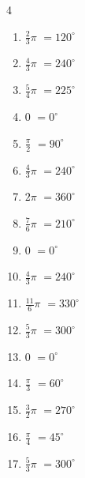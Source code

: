 \begin{multicols}{4}
\begin{enumerate}
  \item $\displaystyle \frac{2}{3}\pi$
        $\displaystyle =120^{\circ}$

  \item $\displaystyle \frac{4}{3}\pi$
        $\displaystyle =240^{\circ}$

  \item $\displaystyle \frac{5}{4}\pi$
        $\displaystyle =225^{\circ}$

  \item $\displaystyle 0$
        $\displaystyle =0^{\circ}$

  \item $\displaystyle \frac{\pi}{2}$
        $\displaystyle =90^{\circ}$

  \item $\displaystyle \frac{4}{3}\pi$
        $\displaystyle =240^{\circ}$

  \item $\displaystyle 2\pi$
        $\displaystyle =360^{\circ}$

  \item $\displaystyle \frac{7}{6}\pi$
        $\displaystyle =210^{\circ}$

  \item $\displaystyle 0$
        $\displaystyle =0^{\circ}$

  \item $\displaystyle \frac{4}{3}\pi$
        $\displaystyle =240^{\circ}$

  \item $\displaystyle \frac{11}{6}\pi$
        $\displaystyle =330^{\circ}$

  \item $\displaystyle \frac{5}{3}\pi$
        $\displaystyle =300^{\circ}$

  \item $\displaystyle 0$
        $\displaystyle =0^{\circ}$

\columnbreak %

\resetques

  \item $\displaystyle \frac{\pi}{3}$
        $\displaystyle =60^{\circ}$

  \item $\displaystyle \frac{3}{2}\pi$
        $\displaystyle =270^{\circ}$

  \item $\displaystyle \frac{\pi}{4}$
        $\displaystyle =45^{\circ}$

  \item $\displaystyle \frac{5}{3}\pi$
        $\displaystyle =300^{\circ}$


\end{enumerate}
\end{multicols}
